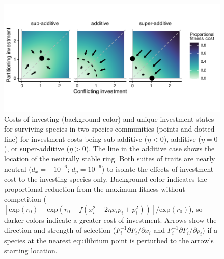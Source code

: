 \documentclass[11pt]{article}
\begin{document}
\clearpage


\begin{figure}[ht!]
\centering
\includegraphics{2-tradeoffs_outcomes.pdf}
\caption{Costs of investing (background color) and unique investment states for surviving species in two-species communities (points and dotted line) for investment costs being sub-additive ($\eta < 0$), additive ($\eta = 0$), or super-additive ($\eta > 0$). The line in the additive case shows the location of the neutrally stable ring. Both suites of traits are nearly neutral ($d_x = -10^{-6}$; $d_p = 10^{-6}$) to isolate the effects of investment cost to the investing species only. Background color indicates the proportional reduction from the maximum fitness without competition 
($\left[ \text{exp} (r_0) - \text{exp} (r_0 - f ( x_i^2 + 2 \eta x_i p_i + 
p_i^2 )) \right] / \text{exp}(r_0)$),
so darker colors indicate a greater cost of investment. 
Arrows show the direction and strength of selection
($ F_i^{-1} \partial F_i / \partial x_i $ and 
$ F_i^{-1} \partial F_i / \partial p_i $)
if a species at the nearest equilibrium point is perturbed to the arrow’s
starting location.}
\label{fig:tradeoffs-outcomes}
\end{figure}



\clearpage
\end{document}
